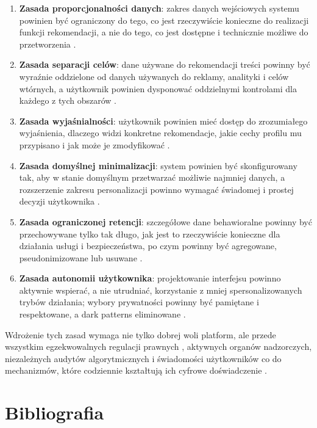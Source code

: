 \documentclass[12pt, a4paper]{article}
\begin{document}
\begin{enumerate}
  \item \textbf{Zasada proporcjonalności danych}: zakres danych wejściowych systemu powinien być ograniczony do tego, co jest rzeczywiście konieczne do realizacji funkcji rekomendacji, a nie do tego, co jest dostępne i technicznie możliwe do przetworzenia \cite{rodo}.
  \item \textbf{Zasada separacji celów}: dane używane do rekomendacji treści powinny być wyraźnie oddzielone od danych używanych do reklamy, analityki i celów wtórnych, a użytkownik powinien dysponować oddzielnymi kontrolami dla każdego z tych obszarów \cite{rodo, edpb2019}.
  \item \textbf{Zasada wyjaśnialności}: użytkownik powinien mieć dostęp do zrozumiałego wyjaśnienia, dlaczego widzi konkretne rekomendacje, jakie cechy profilu mu przypisano i jak może je zmodyfikować \cite{dsa, edpb2019}.
  \item \textbf{Zasada domyślnej minimalizacji}: system powinien być skonfigurowany tak, aby w stanie domyślnym przetwarzać możliwie najmniej danych, a rozszerzenie zakresu personalizacji powinno wymagać świadomej i prostej decyzji użytkownika \cite{rodo, edpb2019}.
  \item \textbf{Zasada ograniczonej retencji}: szczegółowe dane behawioralne powinny być przechowywane tylko tak długo, jak jest to rzeczywiście konieczne dla działania usługi i bezpieczeństwa, po czym powinny być agregowane, pseudonimizowane lub usuwane \cite{rodo, himeur2022}.
  \item \textbf{Zasada autonomii użytkownika}: projektowanie interfejsu powinno aktywnie wspierać, a nie utrudniać, korzystanie z mniej spersonalizowanych trybów działania; wybory prywatności powinny być pamiętane i respektowane, a dark patterns eliminowane \cite{dsa, reuters_nl}.
\end{enumerate}

Wdrożenie tych zasad wymaga nie tylko dobrej woli platform, ale przede wszystkim egzekwowalnych regulacji prawnych \cite{rodo, dsa}, aktywnych organów nadzorczych, niezależnych audytów algorytmicznych \cite{ec_meta_dsa} i świadomości użytkowników co do mechanizmów, które codziennie kształtują ich cyfrowe doświadczenie \cite{chen2025}.

\newpage
\section*{Bibliografia}
\end{document}

